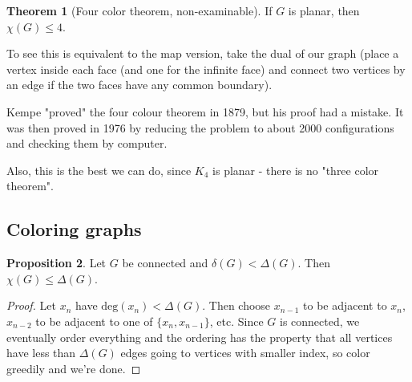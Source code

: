 \documentclass{article}
\theoremstyle{definition}
\newtheorem{theorem}{Theorem}[section]
\newtheorem{prop}[theorem]{Proposition}
\begin{document}
\begin{theorem}[Four color theorem, non-examinable]
    If $G$ is planar, then $\chi(G)\le 4$.
\end{theorem}
To see this is equivalent to the map version, take the dual of our graph (place a vertex inside each face (and one for the infinite face) and connect two vertices by an edge if the two faces have any common boundary).
\vspace{1mm}

Kempe "proved" the four colour theorem in 1879, but his proof had a mistake. It was then proved in 1976 by reducing the problem to about 2000 configurations and checking them by computer.
\vspace{1mm}

Also, this is the best we can do, since $K_4$ is planar - there is no "three color theorem".

\subsection{Coloring graphs}

\begin{prop}\label{3.5}
    Let $G$ be connected and $\delta(G)<\Delta(G)$. Then $\chi(G)\le \Delta(G)$.
\end{prop}
\begin{proof}
    Let $x_n$ have $\text{deg}(x_n) < \Delta(G)$. Then choose $x_{n-1}$ to be adjacent to $x_n$, $x_{n-2}$ to be adjacent to one of $\{x_n,x_{n-1}\}$, etc. Since $G$ is connected, we eventually order everything and the ordering has the property that all vertices have less than $\Delta(G)$ edges going to vertices with smaller index, so color greedily and we're done.
\end{proof}
\end{document}
